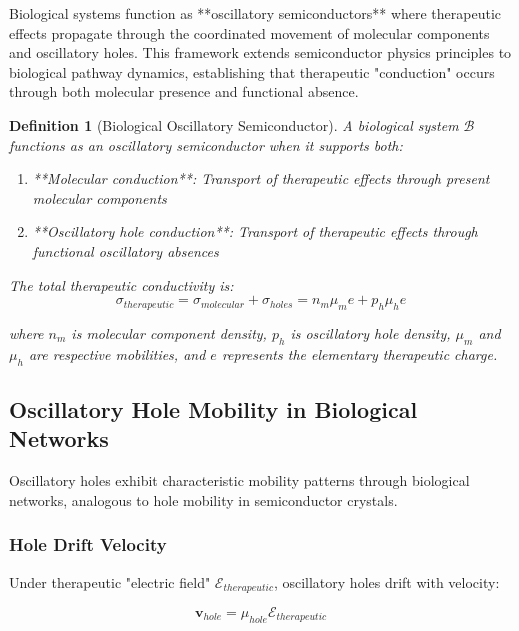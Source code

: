 \documentclass[12pt,a4paper]{article}
\newtheorem{definition}{Definition}[section]
\begin{document}
Biological systems function as **oscillatory semiconductors** where therapeutic effects propagate through the coordinated movement of molecular components and oscillatory holes. This framework extends semiconductor physics principles to biological pathway dynamics, establishing that therapeutic "conduction" occurs through both molecular presence and functional absence.

\begin{definition}[Biological Oscillatory Semiconductor]
A biological system $\mathcal{B}$ functions as an oscillatory semiconductor when it supports both:
\begin{enumerate}
\item **Molecular conduction**: Transport of therapeutic effects through present molecular components
\item **Oscillatory hole conduction**: Transport of therapeutic effects through functional oscillatory absences
\end{enumerate}

The total therapeutic conductivity is:
\begin{equation}
\sigma_{therapeutic} = \sigma_{molecular} + \sigma_{holes} = n_m \mu_m e + p_h \mu_h e
\end{equation}

where $n_m$ is molecular component density, $p_h$ is oscillatory hole density, $\mu_m$ and $\mu_h$ are respective mobilities, and $e$ represents the elementary therapeutic charge.
\end{definition}

\subsection{Oscillatory Hole Mobility in Biological Networks}

Oscillatory holes exhibit characteristic mobility patterns through biological networks, analogous to hole mobility in semiconductor crystals.

\subsubsection{Hole Drift Velocity}

Under therapeutic "electric field" $\mathcal{E}_{therapeutic}$, oscillatory holes drift with velocity:

\begin{equation}
\mathbf{v}_{hole} = \mu_{hole} \mathcal{E}_{therapeutic}
\end{equation}
\end{document}
